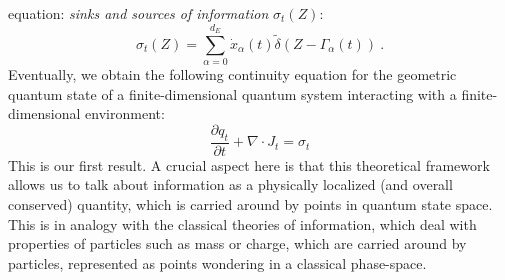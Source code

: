 \documentclass[draft,nofootinbib,pre,twocolumn,showpacs,showkeys,preprintnumbers,floatfix]{revtex4-1}
\newcommand{\1}{\mathbbm{1}}
\begin{document}
equation: \emph{sinks and sources of information} $\sigma_t(Z)$:
\begin{equation}
\sigma_t(Z) = \sum_{\alpha=0}^{d_E} \dot{x}_\alpha(t) \widetilde{\delta}\left(Z - \Gamma_\alpha(t) \right)~.\label{eq:sigma}
\end{equation}
Eventually, we obtain the following continuity equation for the geometric quantum state of a finite-dimensional
quantum system interacting with a finite-dimensional environment:
\begin{equation}
\frac{\partial q_t}{\partial t} + \nabla \cdot J_t = \sigma_t
\end{equation}
This is our first result. A crucial aspect here is that this theoretical framework allows us to talk about information 
as a physically localized (and overall conserved) quantity, which is carried around by points in quantum state space.
This is in analogy with the classical theories of information, which deal with properties of particles such as mass 
or charge, which are carried around by particles, represented as points wondering in a classical phase-space.
\end{document}
